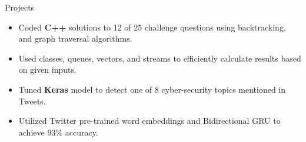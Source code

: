 \documentclass{resume} %
\begin{document}
\begin{workSection}{Projects}
    \customItem[
        title=\href{https://github.com/AshkanArabim/advent-of-code-2022}{Advent of Code 2022 - Annual Programming Challenge \faExternalLink},
        duration=Summer 2023,
    ]
    \begin{itemize}
        \vspace{-0.5em}
        \itemsep -6pt {}
        \item Coded \textbf{C++} solutions to 12 of 25 challenge questions using backtracking, and graph traversal algorithms.
        \item Used classes, queues, vectors, and streams to efficiently calculate results based on given inputs.
    \end{itemize}
    \customItem[
        title=\href{https://github.com/AshkanArabim/cybertweet-topics/tree/main}{Tweet topic detection \faExternalLink},
        duration=Summer 2023,
    ]
    \begin{itemize}
        \vspace{-0.5em}
        \itemsep -6pt {}
        \item Tuned \textbf{Keras} model to detect one of 8 cyber-security topics mentioned in Tweets.
        \item Utilized Twitter pre-trained word embeddings and Bidirectional GRU to achieve 93\% accuracy.
    \end{itemize}

\end{workSection}
\end{document}
